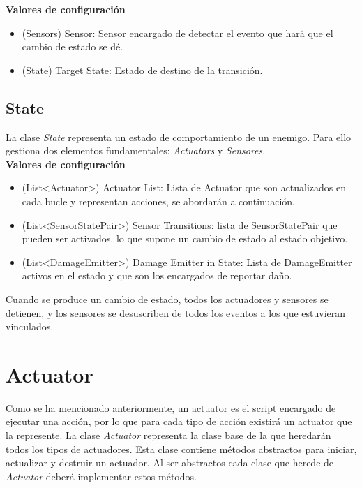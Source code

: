 \textbf{Valores de configuración}
\begin{itemize}
	\item (Sensors) Sensor: Sensor encargado de detectar el evento que hará que el cambio de estado se dé.
	\item (State) Target State: Estado de destino de la transición.
\end{itemize}

\subsection{State}

La clase \textit{State} representa un estado de comportamiento de un enemigo. Para ello gestiona dos elementos fundamentales: \textit{Actuators} y \textit{Sensores}.\\

\textbf{Valores de configuración}
\begin{itemize}
	\item (List<Actuator>) Actuator List: Lista de Actuator que son actualizados en cada bucle y representan acciones, se abordarán a continuación.
	\item (List<SensorStatePair>) Sensor Transitions: lista de SensorStatePair que pueden ser activados, lo que supone un cambio de estado al estado objetivo.
	\item (List<DamageEmitter>) Damage Emitter in State: Lista de DamageEmitter activos en el estado y que son los encargados de reportar daño.
\end{itemize}
Cuando se produce un cambio de estado, todos los actuadores y sensores se detienen, y los sensores se desuscriben de todos los eventos a los que estuvieran vinculados.\\

\section{Actuator}

Como se ha mencionado anteriormente, un actuator es el script encargado de ejecutar una acción, por lo que para cada tipo de acción existirá un actuator que la represente.
La clase \textit{Actuator} representa la clase base de la que heredarán todos los tipos de actuadores.
Esta clase contiene métodos abstractos para iniciar, actualizar y destruir un actuador. Al ser abstractos cada clase que herede de \textit{Actuator} deberá implementar estos métodos.\\

